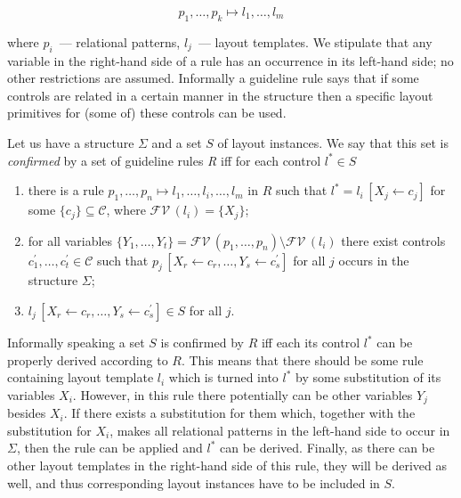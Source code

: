 \[
p_1,\dots,p_k\mapsto l_1,\dots,l_m
\]


\noindent  where $p_i$~--- relational patterns, $l_j$~--- layout templates. We stipulate that any variable in the right-hand side of a
rule has an occurrence in its left-hand side; no other restrictions are assumed. Informally a guideline rule says that if
some controls are related in a certain manner in the structure then a specific layout primitives for (some of) these
controls can be used.





Let us have a structure $\Sigma$ and a set $S$ of layout instances. We say that this set is \emph{confirmed} by a set of
guideline rules \emph{R} iff for each control $l^*\in S$

\begin{enumerate}
\item there is a rule $p_1,\dots,p_n\mapsto l_1,\dots,l_i,\dots, l_m$ in $R$
  such that $l^*=l_i\,[X_j\gets c_j]$  for
  some $\{c_j\}\subseteq\mathcal{C}$, where $\mathcal{FV}\,(l_i)=\{X_j\}$;

\item for all variables $\{Y_1,\dots,Y_t\}=\mathcal{FV}\,(p_1,\dots,p_n)\setminus\mathcal{FV}\,(l_i)$ there exist
  controls $c^\prime_1,\dots,c^\prime_t\in\mathcal{C}$ such that \mbox{$p_j\,[X_r\gets c_r,\dots,Y_s\gets c^\prime_s]$}
  for all $j$ occurs in the structure $\Sigma$;

\item \mbox{$l_j\,[X_r\gets c_r,\dots,Y_s\gets c^\prime_s]\in S$} for all $j$.

\end{enumerate}

Informally speaking a set $S$ is confirmed by $R$ iff each its control $l^*$ can be properly
derived according to $R$. This means that there should be some rule containing
layout template $l_i$ which is turned into $l^*$ by some substitution of its
variables $X_i$. However, in this rule there potentially can be other variables $Y_j$ besides $X_i$.
If there exists a substitution for them which, together with the substitution for $X_i$, makes all
relational patterns in the left-hand side to occur in $\Sigma$, then the rule can be
applied and $l^*$ can be derived. Finally, as there can be other layout templates in the
right-hand side of this rule, they will be derived as well, and thus corresponding
layout instances have to be included in $S$.


